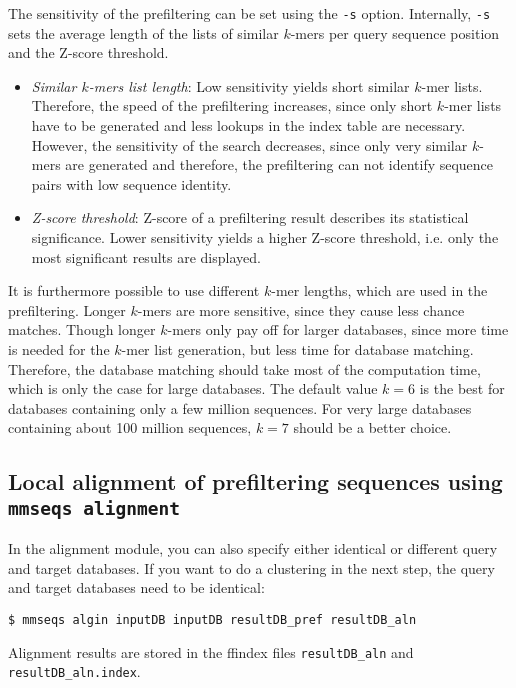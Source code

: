 \documentclass[11pt,a4paper]{scrreprt}
\begin{document}
The sensitivity of the prefiltering can be set using the \texttt{-s} option. Internally, \texttt{-s} sets the average length of the lists of similar $k$-mers per query sequence position and the Z-score threshold.

\begin{itemize}
\item \emph{Similar $k$-mers list length}: Low sensitivity yields short similar $k$-mer lists. Therefore, the speed of the prefiltering increases, since only short $k$-mer lists have to be generated and less lookups in the index table are necessary. However, the sensitivity of the search decreases, since only very similar $k$-mers are generated and therefore, the prefiltering can not identify sequence pairs with low sequence identity.
\item \emph{Z-score threshold}: Z-score of a prefiltering result describes its statistical significance. Lower sensitivity yields a higher Z-score threshold, i.e. only the most significant results are displayed.
\end{itemize}

It is furthermore possible to use different $k$-mer lengths, which are used in the prefiltering. Longer $k$-mers are more sensitive, since they cause less chance matches. Though longer $k$-mers only pay off for larger databases, since more time is needed for the $k$-mer list generation, but less time for database matching. Therefore, the database matching should take most of the computation time, which is only the case for large databases. The default value $k=6$ is the best for databases containing only a few million sequences. For very large databases containing about 100 million sequences, $k=7$ should be a better choice.
\subsection{Local alignment of prefiltering sequences using \texttt{mmseqs alignment}}
In the alignment module, you can also specify either identical or different query and target databases. If you want to do a clustering in the next step, the query and target databases need to be identical:

\begin{verbatim}
$ mmseqs algin inputDB inputDB resultDB_pref resultDB_aln 
\end{verbatim}

Alignment results are stored in the ffindex files \texttt{resultDB\_aln} and \texttt{resultDB\_aln.index}.
\end{document}
